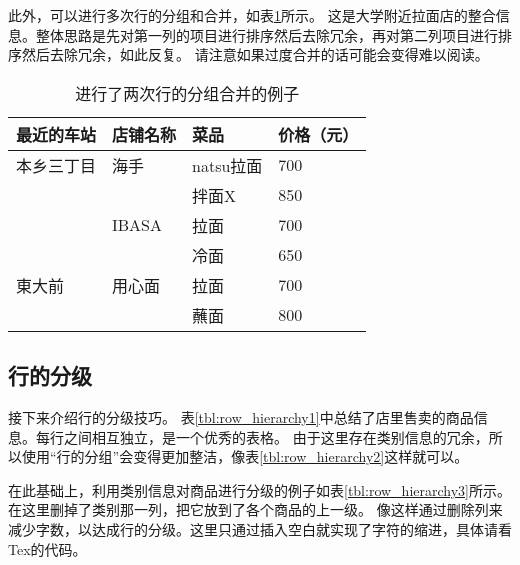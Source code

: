 \documentclass{article}
\newcommand{\Tref}[1]{表\ref{#1}}
\begin{document}
此外，可以进行多次行的分组和合并，如\Tref{tbl:row_group4}所示。
这是大学附近拉面店的整合信息。整体思路是先对第一列的项目进行排序然后去除冗余，再对第二列项目进行排序然后去除冗余，如此反复。
请注意如果过度合并的话可能会变得难以阅读。

\begin{table}[h]
    \centering
    \begin{tabular}{@{}llll@{}} \toprule
        最近的车站 & 店铺名称 & 菜品 & 价格（元） \\ \midrule
        本乡三丁目 & 海手 & natsu拉面 & 700 \\
                  &     & 拌面X & 850 \\
                  & IBASA & 拉面 & 700 \\
                  &       & 冷面 & 650 \\
        東大前  & 用心面 & 拉面 & 700  \\ 
              &         & 蘸面 & 800  \\ \bottomrule   
    \end{tabular}
    \caption{进行了两次行的分组合并的例子}
    \label{tbl:row_group4}
\end{table}


\subsection{行的分级}
接下来介绍行的分级技巧。
\Tref{tbl:row_hierarchy1}中总结了店里售卖的商品信息。每行之间相互独立，是一个优秀的表格。
由于这里存在类别信息的冗余，所以使用“行的分组”会变得更加整洁，像\Tref{tbl:row_hierarchy2}这样就可以。

在此基础上，利用类别信息对商品进行分级的例子如\Tref{tbl:row_hierarchy3}所示。
在这里删掉了类别那一列，把它放到了各个商品的上一级。
像这样通过删除列来减少字数，以达成行的分级。这里只通过插入空白就实现了字符的缩进，具体请看Tex的代码。
\end{document}
